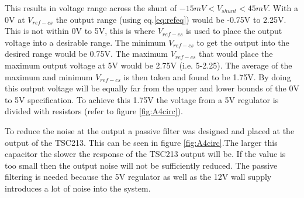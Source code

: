 This results in voltage range across the shunt of $-15mV<V_{shunt}<45mV$. With a 0V at $V_{ref-cs}$ the output range (using eq.\ref{eq:refeq}) would be -0.75V to 2.25V. This is not within 0V to 5V, this is where $V_{ref-cs}$ is used to place the output voltage into a desirable range. The minimum $V_{ref-cs}$ to get the output into the desired range would be 0.75V. The maximum $V_{ref-cs}$ that would place the maximum output voltage at 5V would be 2.75V (i.e. 5-2.25). The average of the maximum and minimum $V_{ref-cs}$ is then taken and found to be 1.75V. By doing this output voltage will be equally far from the upper and lower bounds of the 0V to 5V specification. To achieve this 1.75V the voltage from a 5V regulator is divided with resistors (refer to figure \ref{fig:A4circ}). \newline

To reduce the noise at the output a passive filter was designed and placed at the output of the TSC213. This can be seen in figure \ref{fig:A4circ}.The larger this capacitor the slower the response of the TSC213 output will be. If the value is too small then the output noise will not be sufficiently reduced. The passive filtering is needed because the 5V regulator as well as the 12V wall supply introduces a lot of noise into the system.

